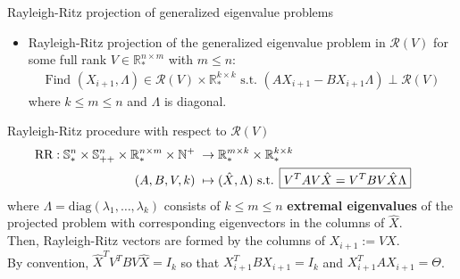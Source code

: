 \documentclass[t,usepdftitle=false]{beamer}
\begin{document}
\begin{frame}{Rayleigh-Ritz projection of generalized eigenvalue problems}
	\begin{itemize}
	\item Rayleigh-Ritz projection of the generalized eigenvalue problem in $\mathcal{R}(V)$ for some full rank $V\in\mathbb{R}^{n\times m}_*$ with $m\leq n$:
	\begin{align*}
	\text{Find }
	(X_{i+1},\Lambda)\in\mathcal{R}(V)\times \mathbb{R}_*^{k\times k}
	\text{ s.t. }
	(AX_{i+1}-BX_{i+1}\Lambda)\perp\mathcal{R}(V)
	\end{align*}
	where $k\leq m\leq n$ and $\Lambda$ is diagonal.
	\end{itemize}
	\vspace{-.05cm}
	\begin{block}{Rayleigh-Ritz procedure with respect to $\mathcal{R}(V)$}
		\vspace{-.3cm}
		\begin{align*}
			\hspace{-.5cm}
			\text{RR}:
			\mathbb{S}_*^{n}\times\mathbb{S}_{++}^{n}\times\mathbb{R}_*^{n\times m}\times\mathbb{N}^+&\;\rightarrow\mathbb{R}_*^{m\times k}\times\mathbb{R}_*^{k\times k}\\
			(A,B,V,k)&\;\mapsto (\hat{X},\Lambda)
			\text{ s.t. }
			\boxed{V^TAV\hat{X}=V^TBV\hat{X}\Lambda }
		\end{align*}
		where $\Lambda=\mathrm{diag}(\lambda_1,\dots,\lambda_k)$ consists of $k\leq m\leq n$ \textbf{extremal eigenvalues}	
		of the projected problem with corresponding eigenvectors in the columns of $\hat{X}\!.\!\!$\\
		\smallskip
		Then, Rayleigh-Ritz vectors are formed by the columns of $X_{i+1}:=V\hat{X}$.\\
		\smallskip
		By convention, $\hat{X}^TV^TBV\hat{X}=I_{k}$ so that $X_{i+1}^TBX_{i+1}=I_k$ and $X_{i+1}^TAX_{i+1}=\Theta$.
	\end{block}
\end{frame}
\end{document}
